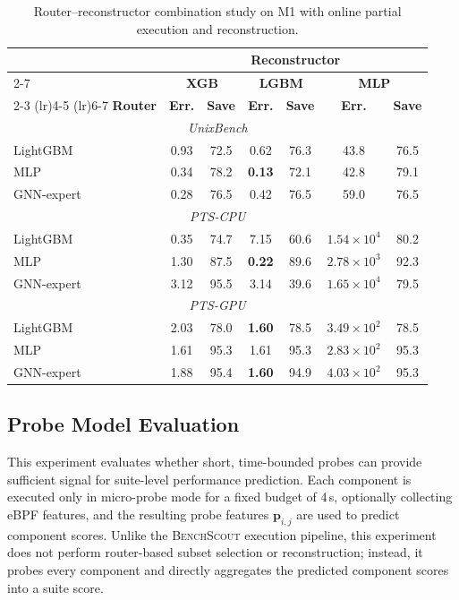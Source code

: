 \documentclass[sigconf, review, anonymous, balance=false]{acmart}
\newcommand{\ourmethod}{\textsc{BenchScout}\xspace}
\newcommand{\ptscpu}{PTS-CPU}
\newcommand{\ptsgpu}{PTS-GPU}
\begin{document}
\begin{table}[t]
\centering
\caption{Router--reconstructor combination study on M1 with online partial execution and reconstruction.}
\label{tab:model-combination}
\small
\setlength{\tabcolsep}{3pt}
\begin{tabular}{l|cc|cc|cc}
\toprule
& \multicolumn{6}{c}{\textbf{Reconstructor}} \\
\cmidrule(lr){2-7}
& \multicolumn{2}{c|}{\textbf{XGB}} 
& \multicolumn{2}{c|}{\textbf{LGBM}} 
& \multicolumn{2}{c}{\textbf{MLP}} \\
\cmidrule(lr){2-3} \cmidrule(lr){4-5} \cmidrule(lr){6-7}
\textbf{Router}
& \textbf{Err.} & \textbf{Save} 
& \textbf{Err.} & \textbf{Save} 
& \textbf{Err.} & \textbf{Save} \\
\midrule
\multicolumn{7}{c}{\textit{UnixBench}} \\
\midrule
LightGBM   & 0.93 & 72.5 & 0.62 & 76.3 & 43.8 & 76.5 \\
MLP        & 0.34 & 78.2 & \textbf{0.13} & 72.1 & 42.8 & 79.1 \\
GNN-expert & 0.28 & 76.5 & 0.42 & 76.5 & 59.0 & 76.5 \\
\midrule
\multicolumn{7}{c}{\textit{\ptscpu}} \\
\midrule
LightGBM   & 0.35 & 74.7 & 7.15 & 60.6 & $1.54{\times}10^{4}$ & 80.2 \\
MLP        & 1.30 & 87.5 & \textbf{0.22} & 89.6 & $2.78{\times}10^{3}$ & 92.3 \\
GNN-expert & 3.12 & 95.5 & 3.14 & 39.6 & $1.65{\times}10^{4}$ & 79.5 \\
\midrule
\multicolumn{7}{c}{\textit{\ptsgpu}} \\
\midrule
LightGBM   & 2.03 & 78.0 & \textbf{1.60} & 78.5 & $3.49{\times}10^{2}$ & 78.5 \\
MLP        & 1.61 & 95.3 & 1.61 & 95.3 & $2.83{\times}10^{2}$ & 95.3 \\
GNN-expert & 1.88 & 95.4 & \textbf{1.60} & 94.9 & $4.03{\times}10^{2}$ & 95.3 \\
\bottomrule
\end{tabular}
\end{table}




\subsection{Probe Model Evaluation}
\label{subsec:probe-evaluation}

This experiment evaluates whether short, time-bounded probes can provide sufficient signal for suite-level performance prediction.
Each component is executed only in micro-probe mode for a fixed budget of 4\,s, optionally collecting eBPF features, and the resulting probe features \(\mathbf{p}_{i,j}\) are used to predict component scores.
Unlike the \ourmethod{} execution pipeline, this experiment does not perform router-based subset selection or reconstruction; instead, it probes every component and directly aggregates the predicted component scores into a suite score.
\end{document}
